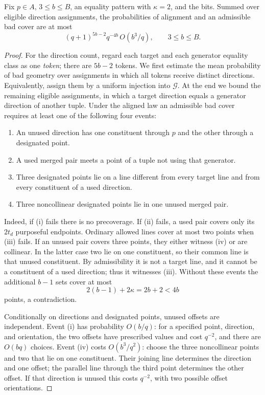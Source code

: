\begin{lemma}\label{lem:pencil-two-reuses}
Fix $p\in A$, $3\le b\le B$, an equality pattern with $\kappa=2$, and
the bits.  Summed over eligible direction assignments, the probabilities
of alignment and an admissible bad cover are at most
\[
 (q+1)^{5b-2}q^{-4b}\,O(b^3/q),\qquad 3\le b\le B.
\]
\end{lemma}

\begin{proof}
For the direction count, regard each target and each generator equality
class as one \emph{token}; there are $5b-2$ tokens.  We first estimate the
mean probability of bad geometry over assignments in which all tokens
receive distinct directions.  Equivalently, assign them by a uniform
injection into $\mathcal G$.  At the end we bound the remaining eligible
assignments, in which a target direction equals a generator direction of
another tuple.  Under the aligned law an admissible bad cover requires at
least one of the following four events:
\begin{enumerate}[label=(\roman*)]
\item An unused direction has one constituent through $p$ and the other
through a designated point.
\item A used merged pair meets a point of a tuple not using that generator.
\item Three designated points lie on a line different from every target
line and from every constituent of a used direction.
\item Three noncollinear designated points lie in one unused merged pair.
\end{enumerate}
Indeed, if (i) fails there is no precoverage.  If (ii) fails, a used pair
covers only its $2t_d$ purposeful endpoints.  Ordinary allowed lines cover
at most two points when (iii) fails.  If an unused pair covers three points,
they either witness (iv) or are collinear.  In the latter case two lie on
one constituent, so their common line is that unused constituent.  By
admissibility it is not a target line, and it cannot be a constituent of
a used direction; thus it witnesses (iii).  Without these events the
additional $b-1$ sets cover at most
\[
 2(b-1)+2\kappa=2b+2<4b
\]
points, a contradiction.

Conditionally on directions and designated points, unused offsets are
independent.  Event (i) has probability $O(b/q)$: for a specified point,
direction, and orientation, the two offsets have prescribed values and
cost $q^{-2}$, and there are $O(bq)$ choices.  Event (iv) costs
$O(b^3/q^2)$: choose the three noncollinear points and two that lie on one
constituent.  Their joining line determines the direction and one offset;
the parallel line through the third point determines the other offset.
If that direction is unused this costs $q^{-2}$, with two possible offset
orientations.


\end{proof}
